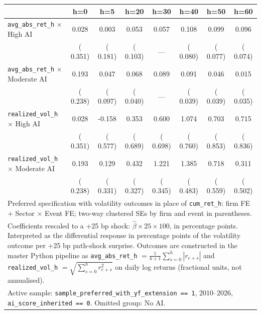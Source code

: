 \begin{tabular}{lccccccc}\hline\hline
 & h=0 & h=5 & h=20 & h=30 & h=40 & h=50 & h=60 \\
\hline
\texttt{avg\_abs\_ret\_h} $\times$ High AI &  0.028 &  0.003 &  0.053 &  0.057 &  0.108 &  0.099 &  0.096 \\
 & ( 0.351) & ( 0.181) & ( 0.103) & --- & ( 0.080) & ( 0.077) & ( 0.074) \\
\texttt{avg\_abs\_ret\_h} $\times$ Moderate AI &  0.193 &  0.047 &  0.068 &  0.089 &  0.091 &  0.046 &  0.015 \\
 & ( 0.238) & ( 0.097) & ( 0.040) & --- & ( 0.039) & ( 0.039) & ( 0.035) \\
\hline
\texttt{realized\_vol\_h} $\times$ High AI &  0.028 & -0.158 &  0.353 &  0.600 &  1.074 &  0.703 &  0.715 \\
 & ( 0.351) & ( 0.577) & ( 0.689) & ( 0.698) & ( 0.760) & ( 0.853) & ( 0.836) \\
\texttt{realized\_vol\_h} $\times$ Moderate AI &  0.193 &  0.129 &  0.432 &  1.221 &  1.385 &  0.718 &  0.311 \\
 & ( 0.238) & ( 0.331) & ( 0.327) & ( 0.345) & ( 0.483) & ( 0.559) & ( 0.502) \\
\hline\hline
\multicolumn{8}{l}{\footnotesize Preferred specification with volatility outcomes in place of \texttt{cum\_ret\_h}: firm FE + Sector $\times$ Event FE; two-way clustered SEs by firm and event in parentheses.} \\
\multicolumn{8}{l}{\footnotesize Coefficients rescaled to a +25 bp shock: $\hat\beta \times 25 \times 100$, in percentage points. Interpreted as the differential response in percentage points of the volatility outcome per +25 bp path-shock surprise. Outcomes are constructed in the master Python pipeline as \texttt{avg\_abs\_ret\_h} $= \tfrac{1}{h+1}\sum_{s=0}^{h}|r_{e+s}|$ and \texttt{realized\_vol\_h} $= \sqrt{\sum_{s=0}^{h} r_{e+s}^{2}}$ on daily log returns (fractional units, not annualised).} \\
\multicolumn{8}{l}{\footnotesize Active sample: \texttt{sample\_preferred\_with\_yf\_extension == 1}, 2010--2026, \texttt{ai\_score\_inherited == 0}. Omitted group: No AI.} \\
\end{tabular}
